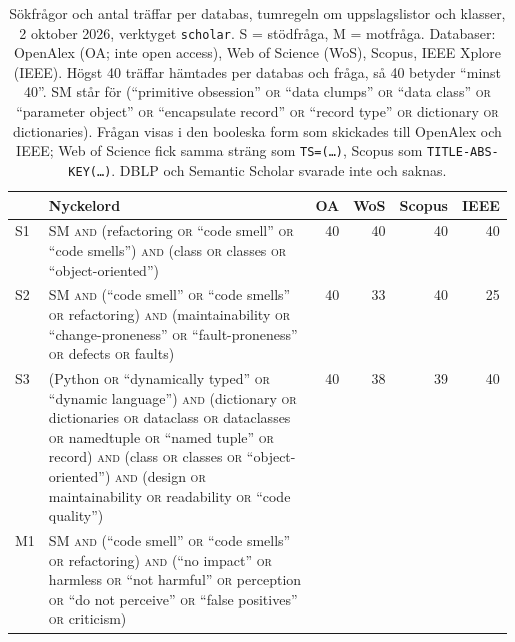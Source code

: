 \begin{table}[!b]
  \centering
  \caption{Sökfrågor och antal träffar per databas, tumregeln om
    uppslagslistor och klasser, 2 oktober 2026, verktyget
    \texttt{scholar}.  S = stödfråga, M = motfråga.  Databaser: OpenAlex
    (OA; inte \foreignlanguage{english}{open access}), Web of Science
    (WoS), Scopus, IEEE Xplore (IEEE).  Högst 40 träffar hämtades per
    databas och fråga, så 40 betyder \enquote{minst 40}.  SM står för
    (\enquote{primitive obsession} \textsc{or} \enquote{data clumps}
    \textsc{or} \enquote{data class} \textsc{or} \enquote{parameter
    object} \textsc{or} \enquote{encapsulate record} \textsc{or}
    \enquote{record type} \textsc{or} dictionary \textsc{or}
    dictionaries).  Frågan visas i den booleska form som skickades till
    OpenAlex och IEEE; Web of Science fick samma sträng som
    \texttt{TS=(\dots)}, Scopus som \texttt{TITLE-ABS-KEY(\dots)}.  DBLP
    och Semantic Scholar svarade inte och saknas.}
  \label{tab:sok-queries-tumregel}
  \footnotesize
  \begin{tabular}{@{}lp{0.58\linewidth}rrrr@{}}
    \toprule
    & Nyckelord & OA & WoS & Scopus & IEEE \\
    \midrule
    S1 & SM \textsc{and} (refactoring \textsc{or} \enquote{code smell} \textsc{or} \enquote{code smells}) \textsc{and} (class \textsc{or} classes \textsc{or} \enquote{object-oriented})
       & 40 & 40 & 40 & 40 \\
    S2 & SM \textsc{and} (\enquote{code smell} \textsc{or} \enquote{code smells} \textsc{or} refactoring) \textsc{and} (maintainability \textsc{or} \enquote{change-proneness} \textsc{or} \enquote{fault-proneness} \textsc{or} defects \textsc{or} faults)
       & 40 & 33 & 40 & 25 \\
    S3 & (Python \textsc{or} \enquote{dynamically typed} \textsc{or} \enquote{dynamic language}) \textsc{and} (dictionary \textsc{or} dictionaries \textsc{or} dataclass \textsc{or} dataclasses \textsc{or} namedtuple \textsc{or} \enquote{named tuple} \textsc{or} record) \textsc{and} (class \textsc{or} classes \textsc{or} \enquote{object-oriented}) \textsc{and} (design \textsc{or} maintainability \textsc{or} readability \textsc{or} \enquote{code quality})
       & 40 & 38 & 39 & 40 \\
    \midrule
    M1 & SM \textsc{and} (\enquote{code smell} \textsc{or} \enquote{code smells} \textsc{or} refactoring) \textsc{and} (\enquote{no impact} \textsc{or} harmless \textsc{or} \enquote{not harmful} \textsc{or} perception \textsc{or} \enquote{do not perceive} \textsc{or} \enquote{false positives} \textsc{or} criticism)

\end{tabular}
\end{table}

